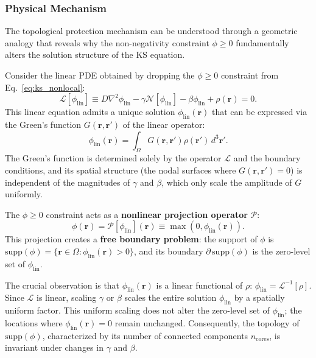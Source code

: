 \documentclass[sn-nature,pdflatex]{sn-jnl}
\begin{document}
\subsubsection{Physical Mechanism}

The topological protection mechanism can be understood through a geometric analogy that reveals why the non-negativity constraint $\phi \ge 0$ fundamentally alters the solution structure of the KS equation.

Consider the linear PDE obtained by dropping the $\phi \ge 0$ constraint from Eq.~\eqref{eq:ks_nonlocal}:
\begin{equation}
\mathcal{L}[\phi_{\text{lin}}] \equiv D\nabla^2\phi_{\text{lin}} - \gamma\mathcal{N}[\phi_{\text{lin}}] - \beta\phi_{\text{lin}} + \rho(\mathbf{r}) = 0.
\end{equation}
This linear equation admits a unique solution $\phi_{\text{lin}}(\mathbf{r})$ that can be expressed via the Green's function $G(\mathbf{r}, \mathbf{r}')$ of the linear operator:
\begin{equation}
\phi_{\text{lin}}(\mathbf{r}) = \int_{\Omega} G(\mathbf{r}, \mathbf{r}') \rho(\mathbf{r}') \, d^3\mathbf{r}'.
\end{equation}
The Green's function is determined solely by the operator $\mathcal{L}$ and the boundary conditions, and its spatial structure (the nodal surfaces where $G(\mathbf{r}, \mathbf{r}') = 0$) is independent of the magnitudes of $\gamma$ and $\beta$, which only scale the amplitude of $G$ uniformly.

The $\phi \ge 0$ constraint acts as a \textbf{nonlinear projection operator} $\mathcal{P}$:
\begin{equation}
\phi(\mathbf{r}) = \mathcal{P}[\phi_{\text{lin}}](\mathbf{r}) \equiv \max(0, \phi_{\text{lin}}(\mathbf{r})).
\end{equation}
This projection creates a \textbf{free boundary problem}: the support of $\phi$ is $\text{supp}(\phi) = \{\mathbf{r} \in \Omega : \phi_{\text{lin}}(\mathbf{r}) > 0\}$, and its boundary $\partial\,\text{supp}(\phi)$ is the zero-level set of $\phi_{\text{lin}}$.

The crucial observation is that $\phi_{\text{lin}}(\mathbf{r})$ is a linear functional of $\rho$: $\phi_{\text{lin}} = \mathcal{L}^{-1}[\rho]$. Since $\mathcal{L}$ is linear, scaling $\gamma$ or $\beta$ scales the entire solution $\phi_{\text{lin}}$ by a spatially uniform factor. This uniform scaling does not alter the zero-level set of $\phi_{\text{lin}}$; the locations where $\phi_{\text{lin}}(\mathbf{r}) = 0$ remain unchanged. Consequently, the topology of $\text{supp}(\phi)$, characterized by its number of connected components $n_{\text{cores}}$, is invariant under changes in $\gamma$ and $\beta$.
\end{document}
